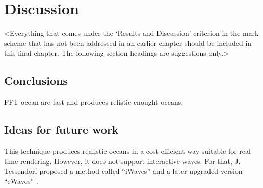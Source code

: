 \chapter{Discussion}
\label{chapter4}

<Everything that comes under the `Results and Discussion' criterion in the mark scheme that has not been addressed in an earlier chapter should be included in this final chapter. The following section headings are suggestions only.>

\section{Conclusions}

FFT ocean are fast and produces relistic enought oceans.

\section{Ideas for future work}
This technique produces realistic oceans in a cost-efficient way suitable for real-time rendering. However, it does not support interactive waves. For that, J. Tessendorf proposed a method called “iWaves” \cite{tessendorf2004} and a later upgraded version “eWaves” \cite{tessendorf2014}.

